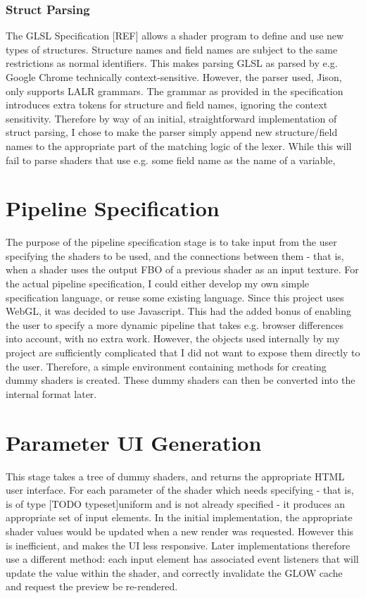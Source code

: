 \documentclass[12pt,twoside,notitlepage]{report}
\begin{document}
\subsubsection{Struct Parsing}
The GLSL Specification [REF] allows a shader program to define and use new types of structures. Structure names and field names are subject to the same restrictions as normal identifiers. This makes parsing GLSL as parsed by e.g. Google Chrome technically context-sensitive. However, the parser used, Jison, only supports LALR grammars.
The grammar as provided in the specification introduces extra tokens for structure and field names, ignoring the context sensitivity. Therefore by way of an initial, straightforward implementation of struct parsing, I chose to make the parser simply append new structure/field names to the appropriate part of the matching logic of the lexer. While this will fail to parse shaders that use e.g. some field name as the name of a variable, 


\section{Pipeline Specification}
The purpose of the pipeline specification stage is to take input from the user specifying the shaders to be used, and the connections between them - that is, when a shader uses the output FBO of a previous shader as an input texture.
For the actual pipeline specification, I could either develop my own simple specification language, or reuse some existing language. Since this project uses WebGL, it was decided to use Javascript. This had the added bonus of enabling the user to specify a more dynamic pipeline that takes e.g. browser differences into account, with no extra work.
However, the objects used internally by my project are sufficiently complicated that I did not want to expose them directly to the user. Therefore, a simple environment containing methods for creating dummy shaders is created. These dummy shaders can then be converted into the internal format later.

\section{Parameter UI Generation}
This stage takes a tree of dummy shaders, and returns the appropriate HTML user interface. For each parameter of the shader which needs specifying - that is, is of type [TODO typeset]uniform and is not already specified - it produces an appropriate set of input elements. In the initial implementation, the appropriate shader values would be updated when a new render was requested. However this is inefficient, and makes the UI less responsive. Later implementations therefore use a different method: each input element has associated event listeners that will update the value within the shader, and correctly invalidate the GLOW cache and request the preview be re-rendered.
\end{document}
